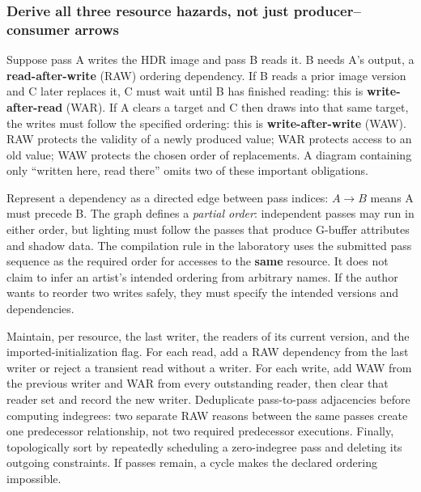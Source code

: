 \subsubsection{Derive all three resource hazards, not just producer--consumer arrows}\label{06-engine-ii-ch042-derive-all-three-resource-hazards-not-just-producerconsumer-arrows}

\hypertarget{06-engine-ii-ch042-derive-all-three-resource-hazards-not-just-producerconsumer-arrows}{}

Suppose pass A writes the HDR image and pass B reads it. B needs A's output, a \textbf{read-after-write} (RAW) ordering dependency. If B reads a prior image version and C later replaces it, C must wait until B has finished reading: this is \textbf{write-after-read} (WAR). If A clears a target and C then draws into that same target, the writes must follow the specified ordering: this is \textbf{write-after-write} (WAW). RAW protects the validity of a newly produced value; WAR protects access to an old value; WAW protects the chosen order of replacements. A diagram containing only ``written here, read there'' omits two of these important obligations.

Represent a dependency as a directed edge between pass indices: \(A\to B\) means A must precede B. The graph defines a \emph{partial order}: independent passes may run in either order, but lighting must follow the passes that produce G-buffer attributes and shadow data. The compilation rule in the laboratory uses the submitted pass sequence as the required order for accesses to the \textbf{same} resource. It does not claim to infer an artist's intended ordering from arbitrary names. If the author wants to reorder two writes safely, they must specify the intended versions and dependencies.

Maintain, per resource, the last writer, the readers of its current version, and the imported-initialization flag. For each read, add a RAW dependency from the last writer or reject a transient read without a writer. For each write, add WAW from the previous writer and WAR from every outstanding reader, then clear that reader set and record the new writer. Deduplicate pass-to-pass adjacencies before computing indegrees: two separate RAW reasons between the same passes create one predecessor relationship, not two required predecessor executions. Finally, topologically sort by repeatedly scheduling a zero-indegree pass and deleting its outgoing constraints. If passes remain, a cycle makes the declared ordering impossible.

